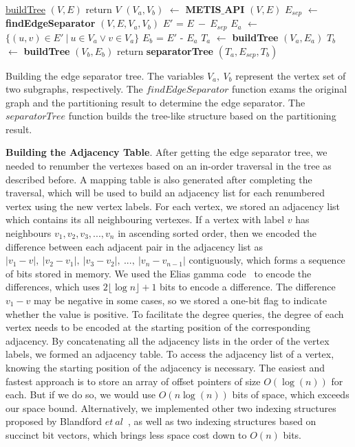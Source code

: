 \documentclass[12pt,glossary]{dalthesis}
\begin{document}
\bigskip

\begin{algorithm}
    \underline{buildTree} $(V,E)$\;
      {
        return $V$\;
      }
      {
      	$(V_{a},V_{b})$ $\leftarrow$ \textbf{METIS$\_$API} $(V,E)$  \;
		$E_{sep}$ $\leftarrow$ \textbf{findEdgeSeparator} $(V,E,V_{a},V_{b})$ \;
		$E'$ = $E \  - \ E_{sep}$   \;
      	$E_{a}$ $\leftarrow$ $\{ (u,v) \in E' \ | \  u\in V_{a} \vee v \in V_{a} \}$ \;
		$E_{b}$ = $E'$ - $E_{a}$ \;
		$T_{a}$ $\leftarrow$ \textbf{buildTree} $(V_{a},E_{a})$ \;
		$T_{b}$ $\leftarrow$ \textbf{buildTree} $(V_{b},E_{b})$ \;  
        return \textbf{separatorTree} $(T_{a}, E_{sep}, T_{b})$ \; 
      }
    \caption{Building the edge separator tree. The variables $V_{a},\ V_{b}$ represent the vertex set of two subgraphs, respectively. The $findEdgeSeparator$ function exams the original graph and the partitioning result to determine the edge separator. The $separatorTree$ function builds the tree-like structure based on the partitioning result.}
\end{algorithm}
\bigskip

\textbf{Building the Adjacency Table}. After getting the edge separator tree, we needed to renumber the vertexes based on an in-order traversal in the tree as described before. A mapping table is also generated after completing the traversal, which will be used to build an adjacency list for each renumbered vertex using the new vertex labels. For each vertex, we stored an adjacency list which contains its all neighbouring vertexes. If a vertex with label $v$ has neighbours $v_{1}, v_{2}, v_{3}, ...,v_{n}$ in ascending sorted order, then we encoded the difference between each adjacent pair in the adjacency list as $|v_{1}-v|, \ |v_{2}-v_{1}|,\  |v_{3}-v_{2}|,\ ...,\ |v_{n}-v_{n-1}|$ contiguously, which forms a sequence of bits stored in memory. We used the Elias gamma code~\cite{Gamma} to encode the differences, which uses $2\lfloor \log n \rfloor + 1$ bits to encode a difference. The difference $v_{1} - v$ may be negative in some cases, so we stored a one-bit flag to indicate whether the value is positive. To facilitate the degree queries, the degree of each vertex needs to be encoded at the starting position of the corresponding adjacency. By concatenating all the adjacency lists in the order of the vertex labels, we formed an adjacency table. To access the adjacency list of a vertex, knowing the starting position of the adjacency is necessary. The easiest and fastest approach is to store an array of offset pointers of size $O(\log (n))$ for each. But if we do so, we would use $O(n\log (n))$ bits of space, which exceeds our space bound. Alternatively, we implemented other two indexing structures proposed by Blandford $et \ al$~\cite{compact-representation}, as well as two indexing structures based on succinct bit vectors, which brings less space cost down to $O(n)$ bits.
\end{document}
